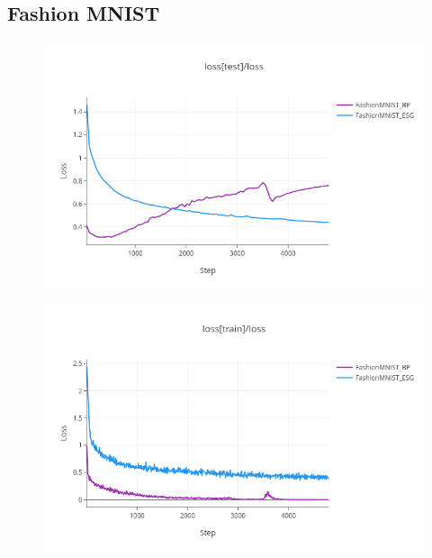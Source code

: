 \documentclass[nohyperref]{article}
\theoremstyle{plain}
\theoremstyle{definition}
\theoremstyle{remark}
\begin{document}
\subsection{Fashion MNIST}
\begin{figure}[ht]
\vskip 0.2in
\begin{center}
\centerline{\includegraphics[width=\columnwidth]{images/FashionMNIST_test.png}}
\caption{}
\end{center}
\vskip -0.2in
\end{figure}
\begin{figure}[ht]
\vskip 0.2in
\begin{center}
\centerline{\includegraphics[width=\columnwidth]{images/FashionMNIST_train.png}}
\caption{}
\end{center}
\vskip -0.2in
\end{figure}
\end{document}
